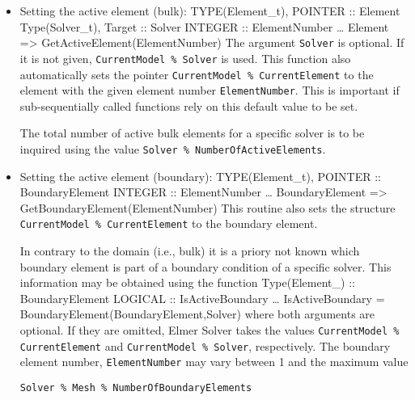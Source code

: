 \begin{itemize}
\item Setting the active element (bulk):
\ttbegin
TYPE(Element_t), POINTER :: Element
Type(Solver_t), Target :: Solver
INTEGER :: ElementNumber
\ldots
Element => GetActiveElement(ElementNumber)
\ttend
The argument \texttt{Solver} is optional. If it is not given, \texttt{CurrentModel \% Solver} is used. This function also automatically sets the pointer \texttt{CurrentModel \% CurrentElement} to the element with the given element number \texttt{ElementNumber}. This is important if sub-sequentially called functions rely on this default value to be set.

The total number of active bulk elements for a specific solver is to be inquired using the value \texttt{Solver \% NumberOfActiveElements}.
\item Setting the active element (boundary):
\ttbegin
TYPE(Element_t), POINTER :: BoundaryElement
INTEGER :: ElementNumber
\ldots
BoundaryElement => GetBoundaryElement(ElementNumber)
\ttend
This routine also sets the structure \texttt{CurrentModel \% CurrentElement} to the boundary element.

In contrary to the domain (i.e., bulk) it is a priory not known which boundary element is part of a boundary condition of a specific solver. This information may be obtained using the function
\ttbegin
Type(Element\_) :: BoundaryElement
LOGICAL :: IsActiveBoundary
\ldots
IsActiveBoundary = BoundaryElement(BoundaryElement,Solver)
\ttend
where both arguments are optional. If they are omitted, Elmer Solver takes the values \texttt{CurrentModel \% CurrentElement} and \texttt{CurrentModel \% Solver}, respectively. The boundary element number, \texttt{ElementNumber} may vary between 1 and the maximum value 
\begin{verbatim}
Solver % Mesh % NumberOfBoundaryElements
\end{verbatim}


\end{itemize}
